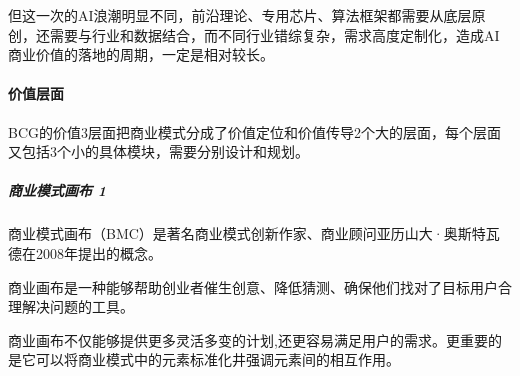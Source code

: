 \documentclass[letterpaper,10pt,english]{sphinxmanual}
\begin{document}
但这一次的AI浪潮明显不同，前沿理论、专用芯片、算法框架都需要从底层原创，还需要与行业和数据结合，而不同行业错综复杂，需求高度定制化，造成AI商业价值的落地的周期，一定是相对较长。


\paragraph{价值层面}
\label{\detokenize{chapter_idea/business:id13}}
BCG的价值3层面把商业模式分成了价值定位和价值传导2个大的层面，每个层面又包括3个小的具体模块，需要分别设计和规划。
%
\begin{footnote}[406]\sphinxAtStartFootnote
{}
%
\end{footnote}


\subparagraph{商业模式画布 1\sphinxfootnotemark[407]}
\label{\detokenize{chapter_idea/business:id14}}%
\begin{footnotetext}[407]\sphinxAtStartFootnote
{}
%
\end{footnotetext}\ignorespaces 
商业模式画布（BMC）是著名商业模式创新作家、商业顾问亚历山大·奥斯特瓦德在2008年提出的概念。

商业画布是一种能够帮助创业者催生创意、降低猜测、确保他们找对了目标用户合理解决问题的工具。

商业画布不仅能够提供更多灵活多变的计划,还更容易满足用户的需求。更重要的是它可以将商业模式中的元素标准化井强调元素间的相互作用。
\end{document}
